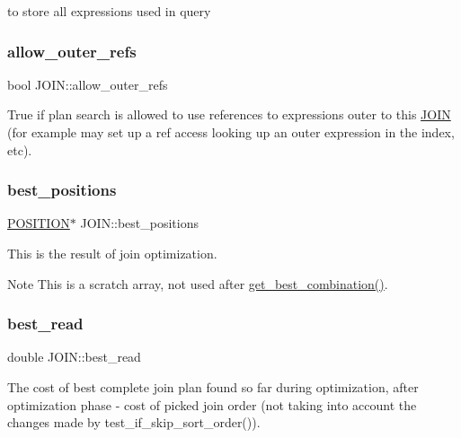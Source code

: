 to store all expressions used in query \mbox{\label{classJOIN_a5de6e2e20ebbd43a75a32f6bf4cf07f7}} 
\subsubsection{\texorpdfstring{allow\+\_\+outer\+\_\+refs}{allow\_outer\_refs}}
{\footnotesize\ttfamily bool J\+O\+I\+N\+::allow\+\_\+outer\+\_\+refs}

True if plan search is allowed to use references to expressions outer to this \mbox{\hyperlink{classJOIN}{J\+O\+IN}} (for example may set up a \textquotesingle{}ref\textquotesingle{} access looking up an outer expression in the index, etc). \mbox{\label{classJOIN_ac7719669bdf6d624e13ab7c6789a84f9}} 
\subsubsection{\texorpdfstring{best\+\_\+positions}{best\_positions}}
{\footnotesize\ttfamily \mbox{\hyperlink{structst__position}{P\+O\+S\+I\+T\+I\+ON}}$\ast$ J\+O\+I\+N\+::best\+\_\+positions}

This is the result of join optimization.

\begin{DoxyNote}{Note}
This is a scratch array, not used after \mbox{\hyperlink{group__Query__Optimizer_gae9c1cf0874f4bda777557d012148e059}{get\+\_\+best\+\_\+combination()}}. 
\end{DoxyNote}
\mbox{\label{classJOIN_ac35bd82ae5071ba3d5c7cd2ee50f8e0d}} 
\subsubsection{\texorpdfstring{best\+\_\+read}{best\_read}}
{\footnotesize\ttfamily double J\+O\+I\+N\+::best\+\_\+read}

The cost of best complete join plan found so far during optimization, after optimization phase -\/ cost of picked join order (not taking into account the changes made by test\+\_\+if\+\_\+skip\+\_\+sort\+\_\+order()). \mbox{\label{classJOIN_a5fa8910d3510d28caa7910981ed3a2e2}} 
